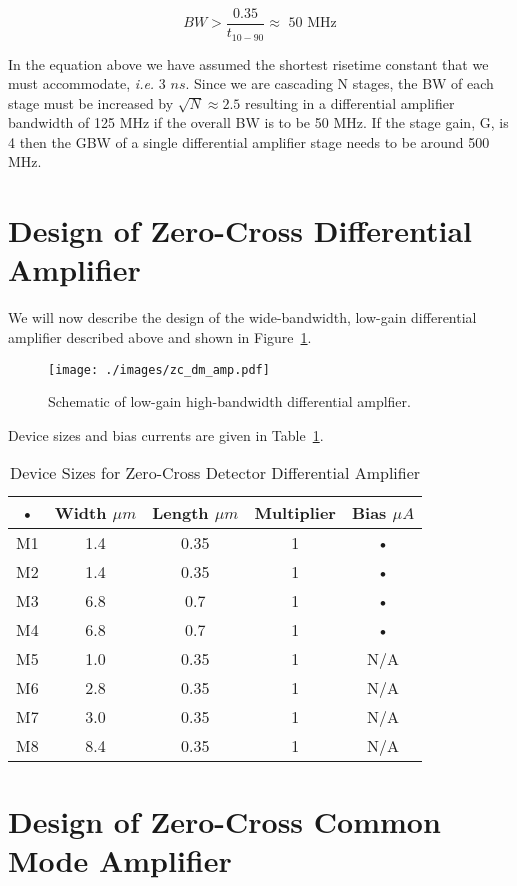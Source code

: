 \documentclass[12pt, onecolumn]{IEEEtran}
\begin{document}
\begin{equation}
BW > \frac{0.35}{t_{10-90}} \approx \text{ 50 MHz}
\end{equation}

\noindent
In the equation above we have assumed the shortest risetime constant that we must accommodate, \emph{i.e.}  3 $ns$. Since we are cascading N stages, the BW of each stage must be increased by $\sqrt{N} \approx 2.5$ resulting in a differential amplifier bandwidth of 125 MHz if the overall BW is to be 50 MHz.  If the stage gain, G, is 4 then the GBW of a single differential amplifier stage needs to be around 500 MHz. \\



\section*{Design of Zero-Cross Differential Amplifier}
We will now describe the design of the wide-bandwidth, low-gain differential amplifier described above and shown in Figure~\ref{FIG:ZC_DM_AMP}. 

\begin{figure}[htbp!]
	\centering
 	\texttt{[image: ./images/zc\_dm\_amp.pdf]}
 	\caption{Schematic of low-gain high-bandwidth differential amplfier.}
 	\label{FIG:ZC_DM_AMP}
\end{figure}
 
 
Device sizes and bias currents are given in Table~\ref{TBL:ZC_DM_AMP}.\\ 
\begin{table} [htbp!]
\begin{center}
\begin{tabular}{|c|c|c|c|c|}
\hline 
• & Width $\mu m$ & Length $\mu m$ &  Multiplier & Bias $\mu A$ \\ 
\hline 
M1 & 1.4 & 0.35 & 1 & • \\ 
\hline 
M2 & 1.4 & 0.35 & 1 & • \\ 
\hline 
M3 & 6.8 & 0.7 & 1 & • \\ 
\hline 
M4 & 6.8 & 0.7 & 1 & • \\ 
\hline 
M5 & 1.0 & 0.35 & 1 & N/A \\ 
\hline 
M6 & 2.8 & 0.35 & 1 & N/A \\ 
\hline 
M7 & 3.0 & 0.35 & 1 & N/A \\ 
\hline 
M8 & 8.4 & 0.35 & 1 & N/A \\ 
\hline 
\end{tabular} 
\end{center}
\label{TBL:ZC_DM_AMP}
\caption{Device Sizes for Zero-Cross Detector Differential Amplifier}
\end{table}

\section*{Design of Zero-Cross Common Mode Amplifier}
\end{document}
